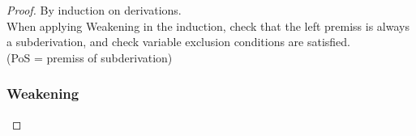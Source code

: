 \documentclass[11pt]{article}
\begin{document}
    \begin{proof}
        By induction on derivations. \\
        When applying Weakening in the induction, check that the left premiss is always a subderivation,
        and check variable exclusion conditions are satisfied. \\
        (PoS = premiss of subderivation)
        \begin{landscape}
        \subsubsection*{Weakening}
        \begin{mathpar}
\end{mathpar}
\end{landscape}
\end{proof}
\end{document}
